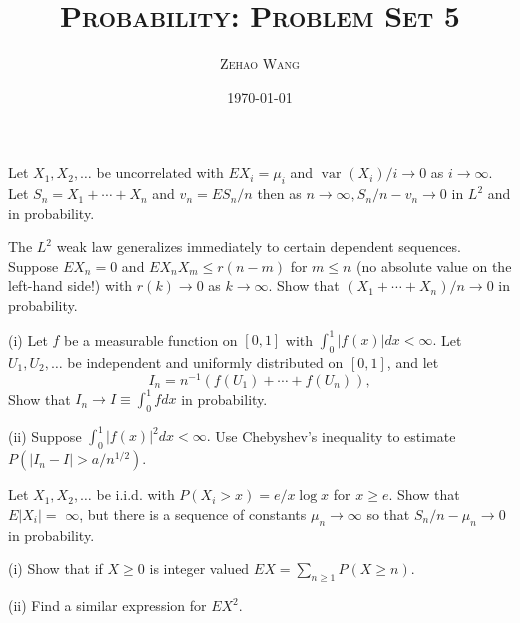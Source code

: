 \documentclass[en, normal, 11pt, black]{elegantnote}
\title{\textsc{Probability: Problem Set 5}}
\author{\textsc{Zehao Wang}}
\date{\today}
\newenvironment{exercise}[1]{\begin{tcolorbox}[colback=black!15, colframe=black!80, breakable, title=#1]}{\end{tcolorbox}}
\begin{document}
    \maketitle
    \begin{exercise}{2.2.1}
        Let $X_{1}, X_{2}, \ldots$ be uncorrelated with $E X_{i}=\mu_{i}$ and $\operatorname{var}\left(X_{i}\right) / i \rightarrow 0$ as $i \rightarrow \infty$. Let $S_{n}=X_{1}+\cdots+X_{n}$ and $v_{n}=E S_{n} / n$ then as $n \rightarrow \infty, S_{n} / n-v_{n} \rightarrow 0$ in $L^{2}$ and in probability. 
    \end{exercise}

    \begin{exercise}{2.2.2}
        The $L^{2}$ weak law generalizes immediately to certain dependent sequences. Suppose $E X_{n}=0$ and $E X_{n} X_{m} \leq r(n-m)$ for $m \leq n$ (no absolute value on the left-hand side!) with $r(k) \rightarrow 0$ as $k \rightarrow \infty$. Show that $\left(X_{1}+\cdots+X_{n}\right) / n \rightarrow 0$ in probability. 
    \end{exercise}

    \begin{exercise}{2.2.3. Monte Carlo integration. }
        (i) Let $f$ be a measurable function on $[0,1]$ with $\int_{0}^{1}|f(x)| d x<\infty .$ Let $U_{1}, U_{2}, \ldots$ be independent and uniformly distributed on $[0,1]$, and let
        \[
            I_{n}=n^{-1}\left(f\left(U_{1}\right)+\cdots+f\left(U_{n}\right)\right), 
        \]
        Show that $I_{n} \rightarrow I \equiv \int_{0}^{1} f d x$ in probability. 
        
        (ii) Suppose $\int_{0}^{1}|f(x)|^{2} d x<\infty .$ Use Chebyshev's inequality to estimate $P\left(\left|I_{n}-I\right|>a / n^{1 / 2}\right)$. 
    \end{exercise}

    \begin{exercise}{2.2.5}
        Let $X_{1}, X_{2}, \ldots$ be i.i.d. with $P\left(X_{i}>x\right)=e / x \log x$ for $x \geq e$. Show that $E\left|X_{i}\right|=$ $\infty$, but there is a sequence of constants $\mu_{n} \rightarrow \infty$ so that $S_{n} / n-\mu_{n} \rightarrow 0$ in probability. 
    \end{exercise}

    \begin{exercise}{2.2.6}
        (i) Show that if $X \geq 0$ is integer valued $E X=\sum_{n \geq 1} P(X \geq n)$. 
        
        (ii) Find a similar expression for $E X^{2}$. 
    \end{exercise}
\end{document}
